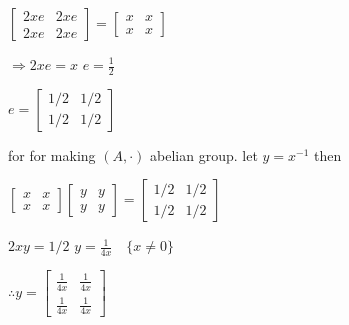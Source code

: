 $\begin{bmatrix} 2xe & 2xe \\ 2xe & 2xe \end{bmatrix} = \begin{bmatrix} x & x \\ x & x \end{bmatrix}$

$\Rightarrow 2xe = x$
$e = \frac{1}{2}$

$e = \begin{bmatrix} 1/2 & 1/2 \\ 1/2 & 1/2 \end{bmatrix}$

for for making $(A, \cdot)$ abelian group.
let $y = x^{-1}$ then

$\begin{bmatrix} x & x \\ x & x \end{bmatrix} \begin{bmatrix} y & y \\ y & y \end{bmatrix} = \begin{bmatrix} 1/2 & 1/2 \\ 1/2 & 1/2 \end{bmatrix}$

$2xy = 1/2$
$y = \frac{1}{4x} \quad \{x \neq 0\}$

$\therefore y = \begin{bmatrix} \frac{1}{4x} & \frac{1}{4x} \\ \frac{1}{4x} & \frac{1}{4x} \end{bmatrix}$
